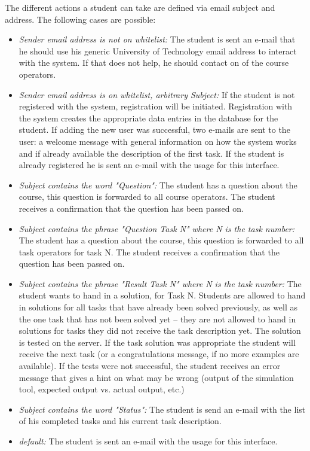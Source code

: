 The different actions a student can take are defined via email subject and address. The following cases
are possible:
\begin{itemize}
\item \textit{Sender email address is not on whitelist:} The student is sent an e-mail that he should use
    his generic University of Technology email address to interact with the system. If that does not help, he 
    should contact on of the course operators.
\item \textit{Sender email address is on whitelist, arbitrary Subject:} If the student is not registered 
    with the system, registration will be initiated. Registration with the system creates the appropriate
    data entries in the database for the student. If adding the new user was successful, two e-mails are 
    sent to the user: a welcome message with general information on how the system works and if already
    available the description of the first task. If the student is already registered he is sent an 
    e-mail with the usage for this interface. 
\item \textit{Subject contains the word "Question":} The student has a question about the course, this 
    question is forwarded to all course operators. The student receives a confirmation that the 
    question has been passed on.
\item \textit{Subject contains the phrase "Question Task N" where N is the task number:} The student 
    has a question about the course, this question is forwarded to all task operators for task N.
    The student receives a confirmation that the question has been passed on.
\item \textit{Subject contains the phrase "Result Task N" where N is the task number:} The student wants 
    to hand in a solution, for Task N. Students are allowed to hand in solutions for all tasks that 
    have already been solved previously, as well as the one task that has not been solved yet -- they
    are not allowed to hand in solutions for tasks they did not receive the task description yet. The
    solution is tested on the server. If the task solution was appropriate the student will receive the
    next task (or a congratulations message, if no more examples are available). If the tests were not
    successful, the student receives an error message that gives a hint on what may be wrong (output of the
    simulation tool, expected output vs. actual output, etc.)
\item \textit{Subject contains the word "Status":} The student is send an e-mail with the list of
    his completed tasks and his current task description.
\item \textit{\textit{default:}} The student is sent an e-mail with the usage for this interface.
\end{itemize}


